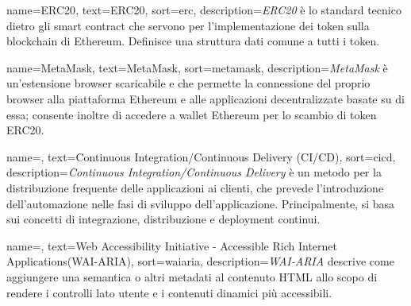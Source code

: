 {
    name={ERC20},
    text=ERC20,
    sort=erc,
    description={\emph{ERC20} è lo standard tecnico dietro gli smart contract che servono per l'implementazione dei token sulla blockchain di Ethereum. Definisce una struttura dati comune a tutti i token.}
}

{
    name={MetaMask},
    text=MetaMask,
    sort=metamask,
    description={\emph{MetaMask} è un'estensione browser scaricabile e che permette la connessione del proprio browser alla piattaforma Ethereum e alle applicazioni decentralizzate basate su di essa; consente inoltre di accedere a wallet Ethereum per lo scambio di token ERC20.}
}

{
    name=,
    text=Continuous Integration/Continuous Delivery (CI/CD),
    sort=cicd,
    description={\emph{Continuous Integration/Continuous Delivery} è un metodo per la distribuzione frequente delle applicazioni ai clienti, che prevede l’introduzione dell’automazione nelle fasi di sviluppo dell’applicazione. Principalmente, si basa sui concetti di integrazione, distribuzione e deployment continui.}
}

{
    name=,
    text=Web Accessibility Initiative - Accessible Rich Internet Applications(WAI-ARIA),
    sort=waiaria,
    description={\emph{WAI-ARIA}  descrive come aggiungere una semantica o altri metadati al contenuto HTML allo scopo di rendere i controlli lato utente e i contenuti dinamici più accessibili.}
}